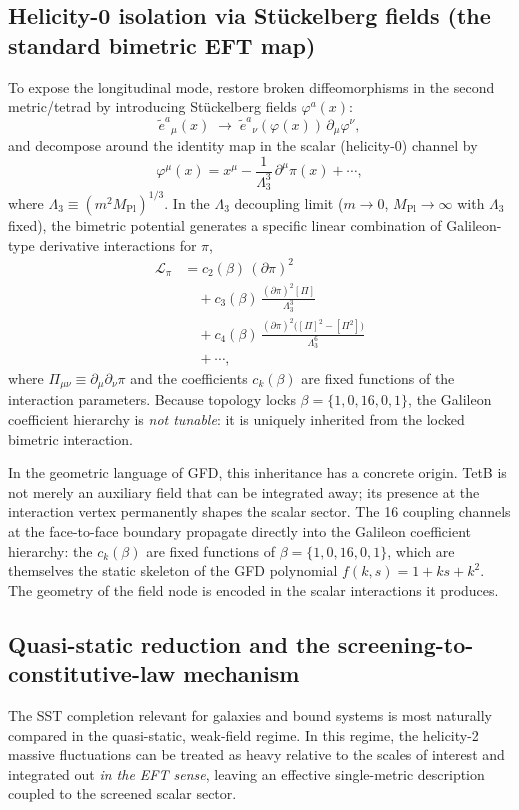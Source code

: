 \documentclass[twocolumn]{iopjournal}
\begin{document}
\subsection*{Helicity-0 isolation via St\"uckelberg fields (the standard bimetric EFT map)}
To expose the longitudinal mode, restore broken diffeomorphisms in the second metric/tetrad by introducing St\"uckelberg fields $\varphi^a(x)$:
\begin{equation}
\tilde e^a{}_\mu(x)\;\longrightarrow\; \tilde e^a{}_\nu(\varphi(x))\,\partial_\mu \varphi^\nu,
\end{equation}
and decompose around the identity map in the scalar (helicity-0) channel by
\begin{equation}
\varphi^\mu(x) = x^\mu - \frac{1}{\Lambda_3^3}\,\partial^\mu \pi(x) + \cdots,
\end{equation}
where $\Lambda_3 \equiv (m^2 M_{\mathrm{Pl}})^{1/3}$.
In the $\Lambda_3$ decoupling limit ($m\to 0$, $M_{\mathrm{Pl}}\to\infty$ with $\Lambda_3$ fixed), the bimetric potential generates a specific linear combination of Galileon-type derivative interactions for $\pi$,
\begin{align}
\mathcal{L}_\pi &= c_2(\beta)\,(\partial\pi)^2 \nonumber \\
&\quad + c_3(\beta)\,\frac{(\partial\pi)^2[\Pi]}{\Lambda_3^3} \nonumber \\
&\quad + c_4(\beta)\,\frac{(\partial\pi)^2\bigl([\Pi]^2-[\Pi^2]\bigr)}{\Lambda_3^6} \nonumber \\
&\quad + \cdots,
\end{align}
where $\Pi_{\mu\nu}\equiv \partial_\mu\partial_\nu\pi$ and the coefficients $c_k(\beta)$ are fixed functions of the interaction parameters.
Because topology locks $\beta=\{1,0,16,0,1\}$, the Galileon coefficient hierarchy is \emph{not tunable}: it is uniquely inherited from the locked bimetric interaction.

In the geometric language of GFD, this inheritance has a concrete origin. TetB is not merely an auxiliary field that can be integrated away; its presence at the interaction vertex permanently shapes the scalar sector. The 16 coupling channels at the face-to-face boundary propagate directly into the Galileon coefficient hierarchy: the $c_k(\beta)$ are fixed functions of $\beta = \{1,0,16,0,1\}$, which are themselves the static skeleton of the GFD polynomial $f(k,s) = 1 + ks + k^2$. The geometry of the field node is encoded in the scalar interactions it produces.

\subsection*{Quasi-static reduction and the screening-to-constitutive-law mechanism}
The SST completion relevant for galaxies and bound systems is most naturally compared in the quasi-static, weak-field regime. In this regime, the helicity-2 massive fluctuations can be treated as heavy relative to the scales of interest and integrated out \emph{in the EFT sense}, leaving an effective single-metric description coupled to the screened scalar sector.
\end{document}
